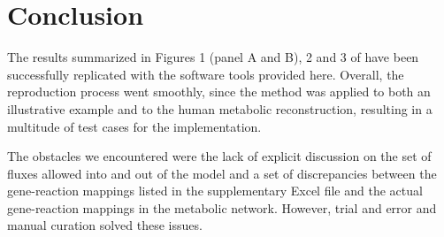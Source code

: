 \documentclass[10pt,a4paper,onecolumn]{article}
\begin{document}
\section{Conclusion}\label{conclusion}

The results summarized in Figures 1 (panel A and B), 2 and 3 of
\autocite{Shlomi2009} have been successfully replicated with the
software tools provided here. Overall, the reproduction process went
smoothly, since the method was applied to both an illustrative example
and to the human metabolic reconstruction, resulting in a multitude of
test cases for the implementation.

The obstacles we encountered were the lack of explicit discussion on the
set of fluxes allowed into and out of the model and a set of
discrepancies between the gene-reaction mappings listed in the
supplementary Excel file and the actual gene-reaction mappings in the
metabolic network. However, trial and error and manual curation solved
these issues.

{\sffamily \small
  \printbibliography[title=References]
}
\end{document}
